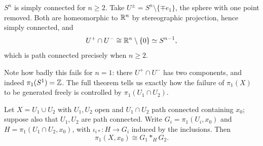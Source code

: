 \documentclass[a4paper]{scrartcl}
\begin{document}
\begin{example} \label{ex:sn-sc}
	$S^n$ is simply connected for $n \geq 2$. Take $U^{\pm} = S^n \setminus \{\mp e_1\}$, the sphere with one point removed. Both are homeomorphic to $\mathbb{R}^n$ by stereographic projection, hence simply connected, and
	$$
	U^+ \cap U^- \cong \mathbb{R}^n \setminus\{0\} \simeq S^{n-1},
	$$
	which is path connected precisely when $n \geq 2$.
\end{example}

Note how badly this fails for $n = 1$: there $U^+ \cap U^-$ has two components, and
indeed $\pi_1(S^1) = \mathbb{Z}$. The full theorem tells us exactly how the failure of $\pi_1(X)$
to be generated freely is controlled by $\pi_1(U_1 \cap U_2)$.

\begin{theorem} \label{thm:vk}
	Let $X = U_1 \cup U_2$ with $U_1, U_2$ open and $U_1 \cap U_2$ path connected containing $x_0$; suppose also that $U_1, U_2$ are path connected. Write $G_i = \pi_1(U_i, x_0)$ and $H = \pi_1(U_1\cap U_2, x_0)$, with $\iota_{i*}: H \to G_i$ induced by the inclusions. Then
	$$
	\pi_1(X, x_0) \cong G_1 *_H G_2 .
	$$
\end{theorem}
\end{document}

